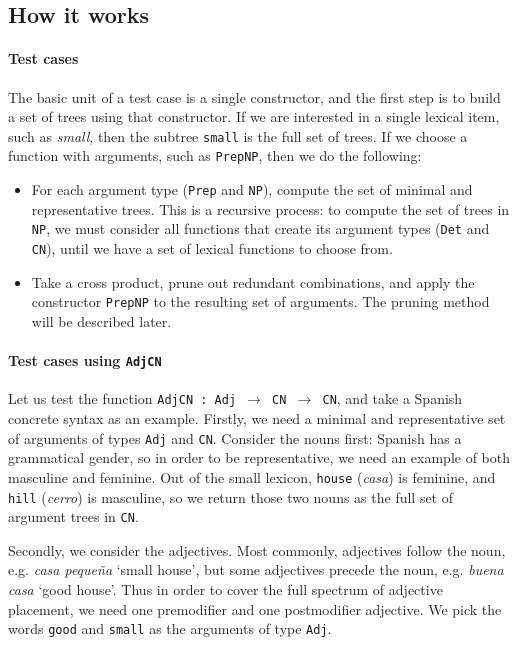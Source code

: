 \documentclass[11pt]{article}
\def\t#1{\texttt{#1}}
\begin{document}
\subsection{How it works}

\paragraph{Test cases} 
The basic unit of a test case is a single constructor, and the first step 
is to build a set of trees using that constructor.
If we are interested in a single lexical item, such as \emph{small}, 
then the subtree \t{small} is the full set of trees. If we choose a function 
with arguments, such as \t{PrepNP}, then we do the following: 
\begin{itemize}
\item For each argument type (\t{Prep} and \t{NP}), compute the
  set of minimal and representative trees. This is a recursive
  process: to compute the set of trees in \t{NP}, we must consider
  all functions that create its argument types (\t{Det} and \t{CN}),
  until we have a set of lexical functions to choose from. 
\item Take a cross product, prune out redundant combinations, and
  apply the constructor \t{PrepNP} to the resulting set of
  arguments. The pruning method will be described later. 
\end{itemize}

\paragraph{Test cases using \t{AdjCN}} Let us test the function
\t{AdjCN : Adj $\rightarrow$ CN $\rightarrow$ CN}, and take a Spanish
concrete syntax as an example. 
Firstly, we need a minimal and representative set of arguments of types
\t{Adj} and \t{CN}. Consider the nouns first: Spanish has a
grammatical gender, so in order to be representative, we need an
example of both masculine and feminine. Out of the small lexicon,
\t{house} (\emph{casa}) is feminine, and \t{hill} (\emph{cerro}) is
masculine, so we return those two nouns as the full set of argument
trees in \t{CN}. 

Secondly, we consider the adjectives. Most commonly, adjectives follow
the noun, e.g. \emph{casa peque\~{n}a} `small house', but some
adjectives precede the noun, e.g. \emph{buena casa} `good house'. Thus 
in order to cover the full spectrum of adjective placement, we need
one premodifier and one postmodifier adjective. We pick the words
\t{good} and \t{small} as the arguments of type \t{Adj}. 
\end{document}

